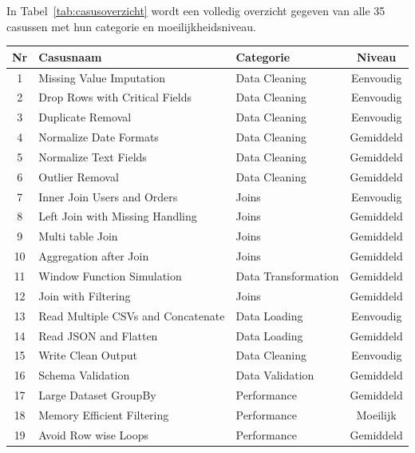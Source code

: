 In Tabel~\ref{tab:casusoverzicht} wordt een volledig overzicht gegeven van alle 35 casussen met hun categorie en moeilijkheidsniveau.

\begin{table}[htbp]
\centering
\small
\setlength{\tabcolsep}{4pt}
\begin{tabular}{cllc}
\toprule
\textbf{Nr} & \textbf{Casusnaam} & \textbf{Categorie} & \textbf{Niveau} \\
\midrule
1  & Missing Value Imputation          & Data Cleaning       & Eenvoudig \\
2  & Drop Rows with Critical Fields    & Data Cleaning       & Eenvoudig \\
3  & Duplicate Removal                 & Data Cleaning       & Eenvoudig \\
4  & Normalize Date Formats            & Data Cleaning       & Gemiddeld \\
5  & Normalize Text Fields             & Data Cleaning       & Gemiddeld \\
6  & Outlier Removal                   & Data Cleaning       & Gemiddeld \\
7  & Inner Join Users and Orders       & Joins               & Eenvoudig \\
8  & Left Join with Missing Handling   & Joins               & Gemiddeld \\
9  & Multi table Join                  & Joins               & Gemiddeld \\
10 & Aggregation after Join            & Joins               & Gemiddeld \\
11 & Window Function Simulation        & Data Transformation & Gemiddeld \\
12 & Join with Filtering               & Joins               & Gemiddeld \\
13 & Read Multiple CSVs and Concatenate & Data Loading       & Eenvoudig \\
14 & Read JSON and Flatten              & Data Loading       & Gemiddeld \\
15 & Write Clean Output                 & Data Cleaning      & Eenvoudig \\
16 & Schema Validation                  & Data Validation    & Gemiddeld \\
17 & Large Dataset GroupBy              & Performance        & Gemiddeld \\
18 & Memory Efficient Filtering         & Performance        & Moeilijk \\
19 & Avoid Row wise Loops               & Performance        & Gemiddeld \\

\end{tabular}
\end{table}

